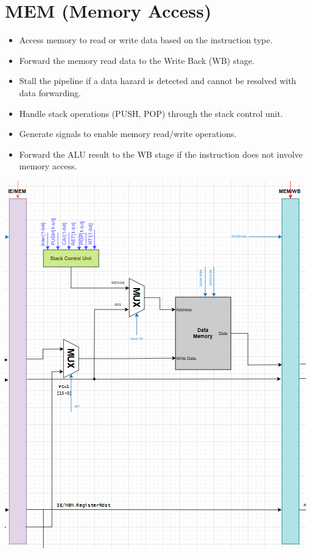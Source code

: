 \documentclass{report}
\begin{document}
\section*{MEM (Memory Access)}
\begin{minipage}{0.6\textwidth}
\begin{itemize}
    \item Access memory to read or write data based on the instruction type.
    \item Forward the memory read data to the Write Back (WB) stage.
    \item Stall the pipeline if a data hazard is detected and cannot be resolved with data forwarding.
    \item Handle stack operations (PUSH, POP) through the stack control unit.
    \item Generate signals to enable memory read/write operations.
    \item Forward the ALU result to the WB stage if the instruction does not involve memory access.
\end{itemize}
\end{minipage}
\hspace{1cm}
\begin{minipage}{0.35\textwidth}
\begin{center}
    \includegraphics[width=\textwidth]{./assets/MEM.png}
\end{center}
\end{minipage}
\end{document}
